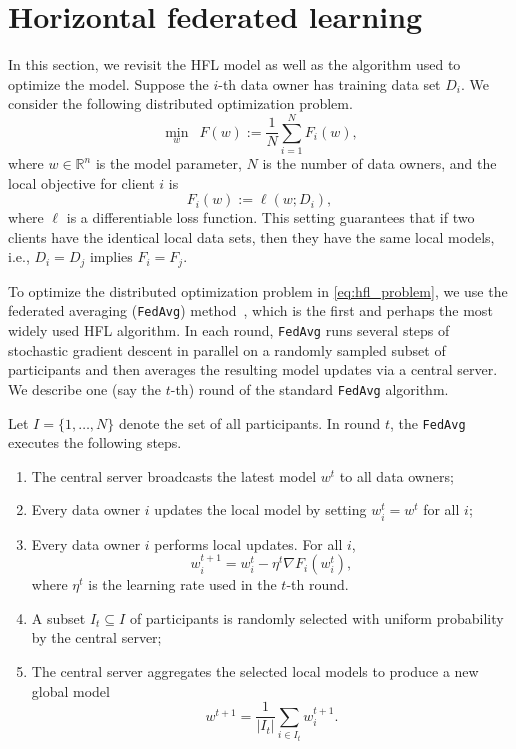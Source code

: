 \section{Horizontal federated learning} \label{sec:7-3}
In this section, we revisit the HFL model as well as the algorithm used to optimize the model. Suppose the $i$-th data owner has training data set $D_i$. We consider the following distributed optimization problem.
\begin{equation} \label{eq:hfl_problem}
    \min_{w}\enspace F(w) := \frac{1}{N}\sum_{i = 1}^N F_i(w),
\end{equation}
where $w\in\mathbb{R}^n$ is the model parameter, $N$ is the number of data owners, and the local objective for client $i$ is
\begin{equation} \label{eq:loss}
    F_i(w) := \ell(w; D_i),
\end{equation}
where $\ell$ is a differentiable loss function. This setting guarantees that if two clients have the identical local data sets, then they have the same local models, i.e., $D_i=D_j$ implies $F_i=F_j$. 

To optimize the distributed optimization problem in \eqref{eq:hfl_problem}, we use the federated averaging (\texttt{FedAvg}) method~\cite{mcmahan2017communication}, which is the first and perhaps the most widely used HFL algorithm. In each round, \texttt{FedAvg} runs several steps of stochastic gradient descent in parallel on a randomly sampled subset of participants and then averages the resulting model updates via a central server. We describe one (say the $t$-th) round of the standard \texttt{FedAvg} algorithm. 

Let $I = \{1, \dots, N\}$ denote the set of all participants. In round $t$, the \texttt{FedAvg} executes the following steps.
\begin{enumerate}
    \item The central server broadcasts the latest model $w^t$ to all data owners;
    \item Every data owner $i$ updates the local model by setting $w_i^t = w^t$ for all $i$;
    \item Every data owner $i$ performs local updates. For all $i$,
    \begin{equation} \label{eq:local_step}
        w_i^{t+1} = w_i^t - \eta^t \nabla F_i(w_i^t),
    \end{equation}
    where $\eta^t$ is the learning rate used in the $t$-th round. 
    \item A subset $I_t \subseteq I$ of participants is randomly selected with uniform probability by the central server;
    \item The central server aggregates the selected local models to produce a new global model
    \begin{equation} \label{eq:global_step}
        w^{t+1} = \frac{1}{|I_t|} \sum_{i \in I_t} w_i^{t+1}.
    \end{equation}
\end{enumerate}

